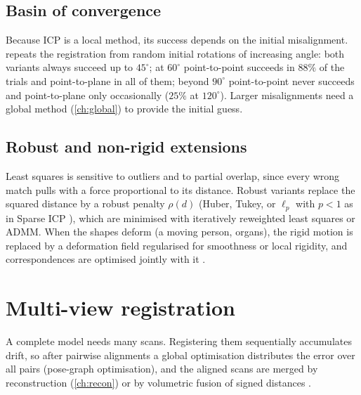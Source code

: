 \subsection{Basin of convergence}

Because ICP is a local method, its success depends on the initial misalignment.
 repeats the registration from random initial rotations of increasing angle:
both variants always succeed up to $45^\circ$; at $60^\circ$ point-to-point succeeds in $88\%$ of
the trials and point-to-plane in all of them; beyond $90^\circ$ point-to-point never succeeds and
point-to-plane only occasionally ($25\%$ at $120^\circ$). Larger misalignments need a global
method (\cref{ch:global}) to provide the initial guess.


\subsection{Robust and non-rigid extensions}

Least squares is sensitive to outliers and to partial overlap, since every wrong match pulls with
a force proportional to its distance. Robust variants replace the squared distance by a robust
penalty $\rho(d)$ (Huber, Tukey, or $\ell_p$ with $p<1$ as in Sparse ICP \citep{Bouaziz2013}),
which are minimised with iteratively reweighted least squares or ADMM. When the shapes deform
(a moving person, organs), the rigid motion is replaced by a deformation field regularised for
smoothness or local rigidity, and correspondences are optimised jointly with it \citep{Li2008}.

\section{Multi-view registration}

A complete model needs many scans. Registering them sequentially accumulates drift, so after
pairwise alignments a global optimisation distributes the error over all pairs (pose-graph
optimisation), and the aligned scans are merged by reconstruction (\cref{ch:recon}) or by
volumetric fusion of signed distances \citep{Curless1996}.


